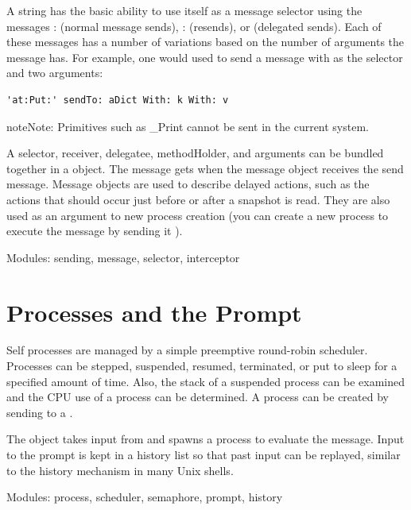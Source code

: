 \documentclass[letterpaper,10pt,english]{sphinxmanual}
\begin{document}
A string has the basic ability to use itself as a message selector using the messages : (normal
message sends), : (resends), or  (delegated sends).
Each of these messages has a number of variations based on the number of arguments the message
has. For example, one would used  to send a message with  as the
selector and two arguments:

\begin{Verbatim}[commandchars=\\\{\}]
'at:Put:' sendTo: aDict With: k With: v
\end{Verbatim}

\begin{notice}{note}{Note:}
Primitives such as \_Print cannot be sent in the current system.
\end{notice}

A selector, receiver, delegatee, methodHolder, and arguments can be bundled together in a 
object. The message gets  when the message object receives the send message. Message
objects are used to describe delayed actions, such as the actions that should occur just before or after
a snapshot is read. They are also used as an argument to new process creation (you can create a
new process to execute the message by sending it ).

Modules: sending, message, selector, interceptor


\section{Processes and the Prompt}
\label{processes:processes-and-the-prompt}\label{processes::doc}
Self processes are managed by a simple preemptive round-robin scheduler. Processes can be
stepped, suspended, resumed, terminated, or put to sleep for a specified amount of time. Also, the
stack of a suspended process can be examined and the CPU use of a process can be determined. A
process can be created by sending  to a .

The  object takes input from  and spawns a process to evaluate the message. Input
to the prompt is kept in a history list so that past input can be replayed, similar to the history mechanism
in many Unix shells.

Modules: process, scheduler, semaphore, prompt, history

\end{document}
